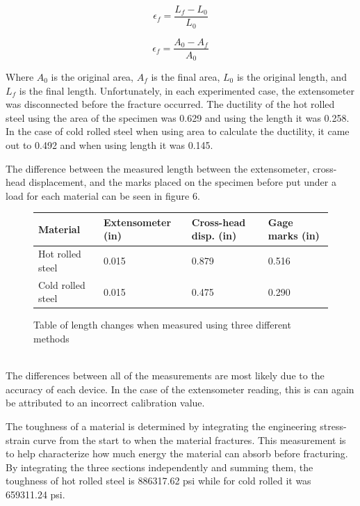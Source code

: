 \documentclass[12pt]{report}
\begin{document}
\begin{equation}
        \epsilon_f = \frac{L_f - L_0}{L_0}
	\label{equation:duclength}
\end{equation}

\begin{equation}
	\epsilon_f = \frac{A_0 - A_f}{A_0}
	\label{equation:ducarea}
\end{equation}

Where \(A_0\) is the original area, \(A_f\) is the final area, \(L_0\) is the original length, and \(L_f\) is the final length. Unfortunately, in each experimented case, the extensometer was disconnected before the fracture occurred. The ductility of the hot rolled steel using the area of the specimen was 0.629 and using the length it was 0.258. In the case of cold rolled steel when using area to calculate the ductility, it came out to 0.492 and when using length it was 0.145. 

The difference between the measured length between the extensometer, cross-head displacement, and the marks placed on the specimen before put under a load for each material can be seen in figure 6.
\\
\begin{figure}[H]
    \begin{tabular}{ | l | l | l | l |}
    \hline
    Material & Extensometer (in) & Cross-head disp. (in) & Gage marks (in) \\ \hline
    Hot rolled steel & 0.015 & 0.879 & 0.516 \\ \hline
    Cold rolled steel & 0.015 & 0.475 & 0.290 \\ \hline
    \end{tabular}
    \caption{Table of length changes when measured using three different methods}
\end{figure}\\

The differences between all of the measurements are most likely due to the accuracy of each device. In the case of the extensometer reading, this is can again be attributed to an incorrect calibration value. 

The toughness of a material is determined by integrating the engineering stress-strain curve from the start to when the material fractures. This measurement is to help characterize how much energy the material can absorb before fracturing. By integrating the three sections independently and summing them, the toughness of hot rolled steel is 886317.62 psi while for cold rolled it was 659311.24 psi. 
\end{document}
